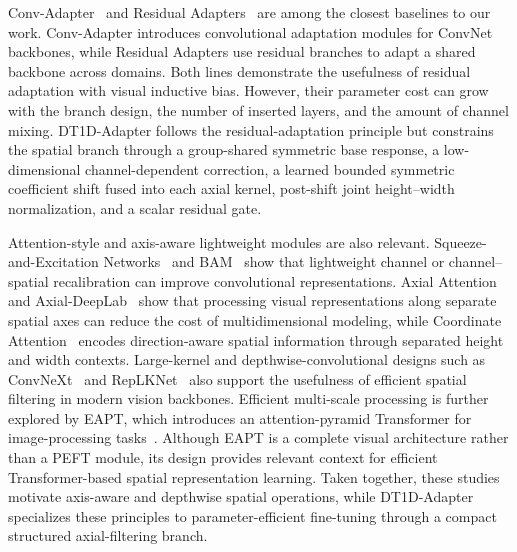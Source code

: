 \documentclass[pdflatex,sn-mathphys-num]{sn-jnl}
\theoremstyle{thmstyleone}
\theoremstyle{thmstyletwo}
\theoremstyle{thmstylethree}
\begin{document}
Conv-Adapter~\cite{chen2024convadapter} and Residual Adapters~\cite{rebuffi2017residual} are among the closest baselines to our work. 
Conv-Adapter introduces convolutional adaptation modules for ConvNet backbones, while Residual Adapters use residual branches to adapt a shared backbone across domains. 
Both lines demonstrate the usefulness of residual adaptation with visual inductive bias. 
However, their parameter cost can grow with the branch design, the number of inserted layers, and the amount of channel mixing. 
DT1D-Adapter follows the residual-adaptation principle but constrains the spatial branch through a group-shared symmetric base response, a low-dimensional channel-dependent correction, a learned bounded symmetric coefficient shift fused into each axial kernel, post-shift joint height--width normalization, and a scalar residual gate.

Attention-style and axis-aware lightweight modules are also relevant. 
Squeeze-and-Excitation Networks~\cite{hu2020senet} and BAM~\cite{park2020lightweightattention} show that lightweight channel or channel--spatial recalibration can improve convolutional representations. 
Axial Attention~\cite{ho2019axialattention} and Axial-DeepLab~\cite{wang2020axialdeeplab} show that processing visual representations along separate spatial axes can reduce the cost of multidimensional modeling, while Coordinate Attention~\cite{hou2021coordinateattention} encodes direction-aware spatial information through separated height and width contexts. 
Large-kernel and depthwise-convolutional designs such as ConvNeXt~\cite{liu2022convnext} and RepLKNet~\cite{ding2022replknet} also support the usefulness of efficient spatial filtering in modern vision backbones. Efficient multi-scale processing is further explored by EAPT, which introduces an attention-pyramid Transformer for image-processing tasks~\cite{lin2023eapt}. Although EAPT is a complete visual architecture rather than a PEFT module, its design provides relevant context for efficient Transformer-based spatial representation learning. 
Taken together, these studies motivate axis-aware and depthwise spatial operations, while DT1D-Adapter specializes these principles to parameter-efficient fine-tuning through a compact structured axial-filtering branch.
\end{document}
